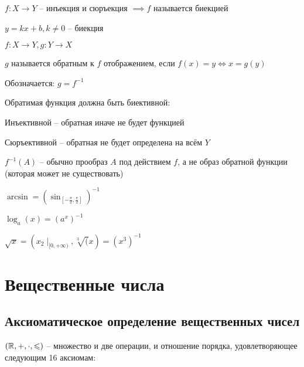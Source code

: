     \begin{definition}[биективность]
        $f:X\to Y$ -- инъекция и сюръекция $\implies f$ называется биекцией
    \end{definition}

    \begin{example}
        $y = kx+b, k\neq 0$ -- биекция
    \end{example}

    \begin{definition}
        $f:X\to Y, g:Y\to X$

        $g$ называется обратным к $f$ отображением, если $f(x) = y \iff  x = g(y)$

        Обозначается: $g = f^{-1}$
    \end{definition}
    \begin{note}
        Обратимая функция должна быть биективной:
        
        Инъективной -- обратная иначе не будет функцией

        Сюръективной -- обратная не будет определена на всём $Y$
    \end{note}
    \begin{note}
        $f^{-1}(A)$ -- обычно прообраз $A$ под действием $f$, а не образ обратной функции (которая может не существовать)
   \end{note}

   \begin{example}
       $\arcsin = (\sin _{[-\frac{\pi}{2}, \frac{\pi}{2}]  })^{-1}$

       $\log_a(x) = (a^x)^{-1}$

       $\sqrt{x} = (x_{2}\mid_{[0,+\infty )} , \sqrt[3](x) = (x^3)^{-1} $
   \end{example}
   \section{Вещественные числа}
    \subsection{Аксиоматическое определение вещественных чисел}

        $(\mathbb{R}, +, \cdot, \leqslant )$ -- множество и две операции, и отношение порядка, удовлетворяющее следующим 16 аксиомам:
        
